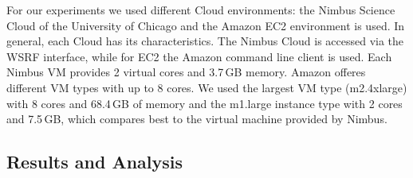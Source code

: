 \documentclass[3p,twocolumn]{elsarticle}
\begin{document}
For our experiments we used different Cloud environments: the Nimbus
Science Cloud of the University of Chicago and the Amazon EC2
environment is used. In general, each Cloud has its
characteristics. The Nimbus Cloud is accessed via the WSRF interface,
while for EC2 the Amazon command line client is used. Each Nimbus VM
provides 2 virtual cores and 3.7\,GB memory.  Amazon offeres different
VM types with up to 8 cores. We used the largest VM type (m2.4xlarge)
with 8 cores and 68.4\,GB of memory and the m1.large instance type
with 2 cores and 7.5\,GB, which compares best to the virtual machine
provided by Nimbus.


\subsection{Results and Analysis}
\end{document}
